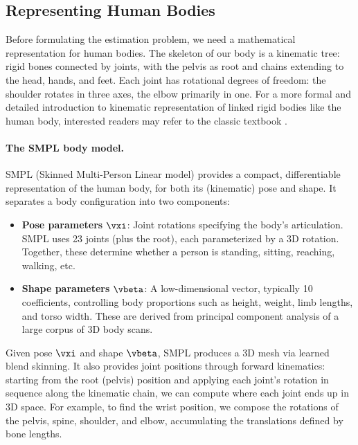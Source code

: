 \documentclass[../../book-main.tex]{subfiles}
\begin{document}
\subsection{Representing Human Bodies}
\label{sub:egoallo_body_models}

Before formulating the estimation problem, we need a mathematical
representation for human bodies.  The skeleton of our body is a
kinematic tree: rigid bones connected by joints, with the pelvis as
root and chains extending to the head, hands, and feet. Each joint
has rotational degrees of freedom: the shoulder rotates in three
axes, the elbow primarily in one. For a more formal and detailed
introduction to kinematic representation of linked rigid bodies like
the human body, interested readers may refer to the classic textbook
\citep{MurrayR1994}.

\paragraph{The SMPL body model.}
SMPL (Skinned Multi-Person Linear model) \citep{loper2015smpl}
provides a compact, differentiable representation of the human body,
for both its (kinematic) pose and shape. It separates a body
configuration into two components:
\begin{itemize}
    \item \textbf{Pose parameters} \(\vxi\): Joint rotations
        specifying the body's articulation. SMPL uses 23 joints (plus
        the root), each parameterized by a 3D rotation. Together,
        these determine whether a person is standing, sitting,
        reaching, walking, etc.
    \item \textbf{Shape parameters} \(\vbeta\): A low-dimensional
        vector, typically 10 coefficients, controlling body
        proportions such as height, weight, limb lengths, and torso
        width. These are derived from principal component analysis of
        a large corpus of 3D body scans.
\end{itemize}

Given pose \(\vxi\) and shape \(\vbeta\), SMPL produces a 3D mesh via
learned blend skinning. It also provides joint positions through
forward kinematics: starting from the root (pelvis) position and
applying each joint's rotation in sequence along the kinematic chain,
we can compute where each joint ends up in 3D space. For example, to
find the wrist position, we compose the rotations of the pelvis,
spine, shoulder, and elbow, accumulating the translations defined by
bone lengths.
\end{document}
